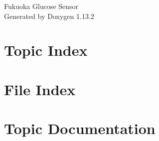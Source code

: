 \documentclass[twoside]{book}
\newcommand{\+}{\discretionary{\mbox{\scriptsize$\hookleftarrow$}}{}{}}
\newcommand{\clearemptydoublepage}{%
    \newpage{\pagestyle{empty}\cleardoublepage}%
  }
\begin{document}
  \raggedbottom
    \hypersetup{pageanchor=false,
                bookmarksnumbered=true,
                pdfencoding=unicode
               }
  \begin{titlepage}
  \vspace*{7cm}
  \begin{center}%
  {\Large Fukuoka Glucose Sensor}\\
  \vspace*{1cm}
  {\large Generated by Doxygen 1.13.2}\\
  \end{center}
  \end{titlepage}
  \clearemptydoublepage
  \tableofcontents
  \clearemptydoublepage
  \hypersetup{pageanchor=true}
\chapter{Topic Index}

\chapter{File Index}

\chapter{Topic Documentation}


\end{document}
